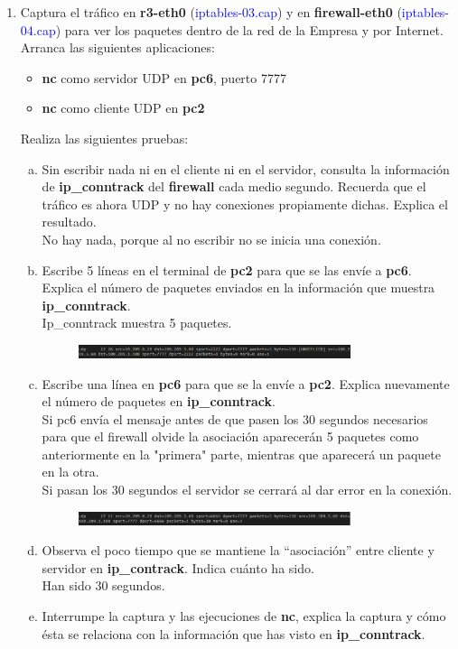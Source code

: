 \documentclass[12pt, a4paper]{report}
\begin{document}
\begin{enumerate}
	\item Captura el tráfico en \textbf{r3-eth0} (\textcolor{blue}{iptables-03.cap}) y en \textbf{firewall-eth0} (\textcolor{blue}{iptables-04.cap}) para
	ver los paquetes dentro de la red de la Empresa y por Internet. Arranca las siguientes aplicaciones:
	\begin{itemize}
		\item \textbf{nc} como servidor UDP en \textbf{pc6}, puerto 7777
		\item \textbf{nc} como cliente UDP en \textbf{pc2}
	\end{itemize}
	Realiza las siguientes pruebas:
	\begin{enumerate}[a)]
		\item Sin escribir nada ni en el cliente ni en el servidor, consulta la información de \textbf{ip\_conntrack}
		del \textbf{firewall} cada medio segundo. Recuerda que el tráfico es ahora UDP y no hay conexiones
		propiamente dichas. Explica el resultado.\\
		No hay nada, porque al no escribir no se inicia una conexión.
		\item Escribe 5 líneas en el terminal de \textbf{pc2} para que se las envíe a \textbf{pc6}. Explica el número de
		paquetes enviados en la información que muestra \textbf{ip\_conntrack}.\\
		Ip\_conntrack muestra 5 paquetes.\\
		\begin{figure}[h]
			\centering
			\includegraphics[width=0.8\textwidth]{ej2.1.2_1.b}
		\end{figure}
		\item Escribe una línea en \textbf{pc6 }para que se la envíe a \textbf{pc2}. Explica nuevamente el número de
		paquetes en \textbf{ip\_conntrack}.\\
		
		Si pc6 envía el mensaje antes de que pasen los 30 segundos necesarios para que el firewall olvide la asociación aparecerán 5 paquetes como anteriormente en la "primera" parte, mientras que aparecerá un paquete en la otra.\\
		Si pasan los 30 segundos el servidor se cerrará al dar error en la conexión.\\
		\begin{figure}[h]
			\centering
			\includegraphics[width=0.8\textwidth]{ej2.1.2_1.c}
		\end{figure}
		\item Observa el poco tiempo que se mantiene la “asociación” entre cliente y servidor en \textbf{ip\_contrack}.
		Indica cuánto ha sido.\\
		Han sido 30 segundos.
		\item Interrumpe la captura y las ejecuciones de \textbf{nc}, explica la captura y cómo ésta se relaciona
		con la información que has visto en \textbf{ip\_conntrack}.\\
		

\end{enumerate}
\end{enumerate}
\end{document}
